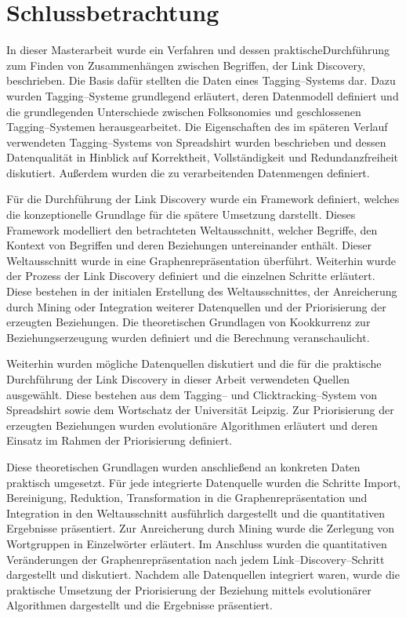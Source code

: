 \chapter{Schlussbetrachtung}
\label{summary}

In dieser Masterarbeit wurde ein Verfahren und dessen praktischeDurchführung zum Finden von Zusammenhängen zwischen Begriffen, der Link Discovery, beschrieben. Die Basis dafür stellten die Daten eines Tagging--Systems dar. Dazu wurden Tagging--Systeme grundlegend erläutert, deren Datenmodell definiert und die grundlegenden Unterschiede zwischen Folksonomies und geschlossenen Tagging--Systemen herausgearbeitet. Die Eigenschaften des im späteren Verlauf verwendeten Tagging--Systems von Spreadshirt wurden beschrieben und dessen Datenqualität in Hinblick auf Korrektheit, Vollständigkeit und Redundanzfreiheit diskutiert. Außerdem wurden die zu verarbeitenden Datenmengen definiert.

Für die Durchführung der Link Discovery wurde ein Framework definiert, welches die konzeptionelle Grundlage für die spätere Umsetzung darstellt. Dieses Framework modelliert den betrachteten Weltausschnitt, welcher Begriffe, den Kontext von Begriffen und deren Beziehungen untereinander enthält. Dieser Weltausschnitt wurde in eine Graphenrepräsentation überführt. Weiterhin wurde der Prozess der Link Discovery definiert und die einzelnen Schritte erläutert. Diese bestehen in der initialen Erstellung des Weltausschnittes, der Anreicherung durch Mining oder Integration weiterer Datenquellen und der Priorisierung der erzeugten Beziehungen. Die theoretischen Grundlagen von Kookkurrenz zur Beziehungserzeugung wurden definiert und die Berechnung veranschaulicht.

Weiterhin wurden mögliche Datenquellen diskutiert und die für die praktische Durchführung der Link Discovery in dieser Arbeit verwendeten Quellen ausgewählt. Diese bestehen aus dem Tagging-- und Clicktracking--System von Spreadshirt sowie dem Wortschatz der Universität Leipzig. Zur Priorisierung der erzeugten Beziehungen wurden evolutionäre Algorithmen erläutert und deren Einsatz im Rahmen der Priorisierung definiert.

Diese theoretischen Grundlagen wurden anschließend an konkreten Daten praktisch umgesetzt. Für jede integrierte Datenquelle wurden die Schritte Import, Bereinigung, Reduktion, Transformation in die Graphenrepräsentation und Integration in den Weltausschnitt ausführlich dargestellt und die quantitativen Ergebnisse präsentiert. Zur Anreicherung durch Mining wurde die Zerlegung von Wortgruppen in Einzelwörter erläutert. Im Anschluss wurden die quantitativen Veränderungen der Graphenrepräsentation nach jedem Link--Discovery--Schritt dargestellt und diskutiert. Nachdem alle Datenquellen integriert waren, wurde die praktische Umsetzung der Priorisierung der Beziehung mittels evolutionärer Algorithmen dargestellt und die Ergebnisse präsentiert.

